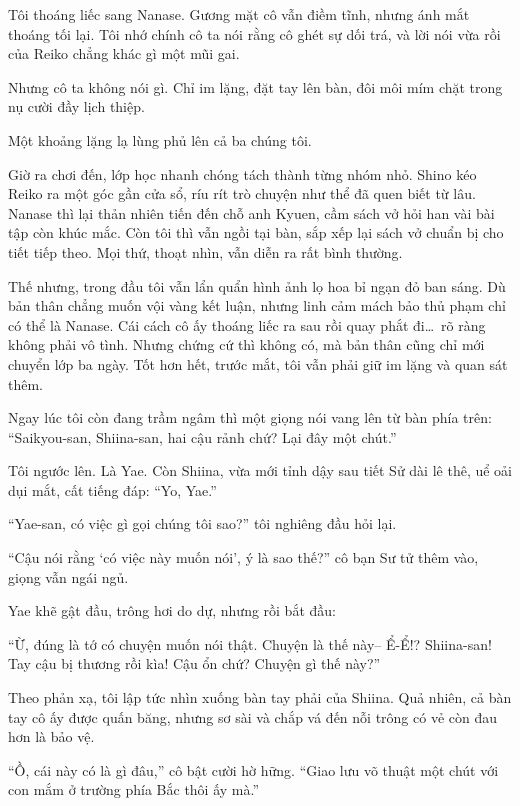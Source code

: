 \documentclass[../main.tex]{subfiles}
\begin{document}
Tôi thoáng liếc sang Nanase. Gương mặt cô vẫn điềm tĩnh, nhưng ánh mắt thoáng tối lại. Tôi nhớ chính cô ta nói rằng cô ghét sự dối trá, và lời nói vừa rồi của Reiko chẳng khác gì một mũi gai.

Nhưng cô ta không nói gì. Chỉ im lặng, đặt tay lên bàn, đôi môi mím chặt trong nụ cười đầy lịch thiệp.

Một khoảng lặng lạ lùng phủ lên cả ba chúng tôi.

\ct

Giờ ra chơi đến, lớp học nhanh chóng tách thành từng nhóm nhỏ. Shino kéo Reiko ra một góc gần cửa sổ, ríu rít trò chuyện như thể đã quen biết từ lâu. Nanase thì lại thản nhiên tiến đến chỗ anh Kyuen, cầm sách vở hỏi han vài bài tập còn khúc mắc. Còn tôi thì vẫn ngồi tại bàn, sắp xếp lại sách vở chuẩn bị cho tiết tiếp theo. Mọi thứ, thoạt nhìn, vẫn diễn ra rất bình thường.

Thế nhưng, trong đầu tôi vẫn lẩn quẩn hình ảnh lọ hoa bỉ ngạn đỏ ban sáng. Dù bản thân chẳng muốn vội vàng kết luận, nhưng linh cảm mách bảo thủ phạm chỉ có thể là Nanase. Cái cách cô ấy thoáng liếc ra sau rồi quay phắt đi\dots\ rõ ràng không phải vô tình. Nhưng chứng cứ thì không có, mà bản thân cũng chỉ mới chuyển lớp ba ngày. Tốt hơn hết, trước mắt, tôi vẫn phải giữ im lặng và quan sát thêm.

Ngay lúc tôi còn đang trầm ngâm thì một giọng nói vang lên từ bàn phía trên: ``Saikyou-san, Shiina-san, hai cậu rảnh chứ? Lại đây một chút.''

Tôi ngước lên. Là Yae. Còn Shiina, vừa mới tỉnh dậy sau tiết Sử dài lê thê, uể oải dụi mắt, cất tiếng đáp: ``Yo, Yae.''

``Yae-san, có việc gì gọi chúng tôi sao?'' tôi nghiêng đầu hỏi lại.

``Cậu nói rằng `có việc này muốn nói', ý là sao thế?'' cô bạn Sư tử thêm vào, giọng vẫn ngái ngủ.

Yae khẽ gật đầu, trông hơi do dự, nhưng rồi bắt đầu:

``Ừ, đúng là tớ có chuyện muốn nói thật. Chuyện là thế này-- Ể-Ể!? Shiina-san! Tay cậu bị thương rồi kìa! Cậu ổn chứ? Chuyện gì thế này?''

Theo phản xạ, tôi lập tức nhìn xuống bàn tay phải của Shiina. Quả nhiên, cả bàn tay cô ấy được quấn băng, nhưng sơ sài và chắp vá đến nỗi trông có vẻ còn đau hơn là bảo vệ.

``Ồ, cái này có là gì đâu,'' cô bật cười hờ hững. ``Giao lưu võ thuật một chút với con mắm ở trường phía Bắc thôi ấy mà.''
\end{document}
